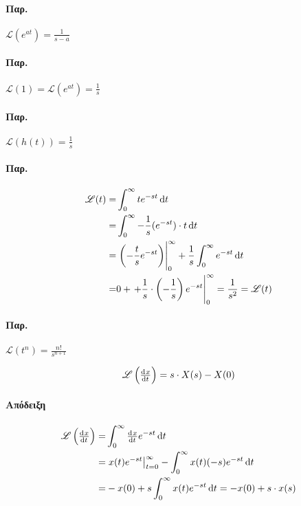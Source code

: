 \documentclass[11pt,a4paper,titlepage,draft]{article}
\begin{document}
\paragraph{Παρ.}
\(
\mathscr{L}(e^{at}) = \frac{1}{s-a}
\)

\paragraph{Παρ.}
\(
\mathscr{L}(1) = \mathscr{L}(e^{at})=\frac{1}{s}
\)

\paragraph{Παρ.}
\(
\mathscr{L}\left(h(t)\right) = \frac{1}{s}
\)

\paragraph{Παρ.}
\begin{align*}
\mathscr{L}(t)=&\int_0^\infty te^{-st}\dif t
\\=&
\int_0^\infty -\frac{1}{s} (e^{-st})\cdot t \dif t
\\=&
\left.\left( -\frac{t}{s}e^{-st}\right)\right|_0^\infty + \frac{1}{s}\int_0^\infty e^{-st}\dif t
\\=&
0+\left. + \frac{1}{s}\cdot\left(-\frac{1}{s}\right) e^{-st}\right|_0^\infty = \frac{1}{s^2}=\mathscr{L}(t)
\end{align*}

\paragraph{Παρ.}
\(
\mathscr{L}(t^n) = \frac{n!}{s^{n+1}}
\)

\begin{theorem*}{}
\[
\mathscr{L}\left(
\od{x}{t}
\right)
= s\cdot X(s)-X(0)
\]
\end{theorem*}
\paragraph{Απόδειξη}
\begin{align*}
\mathscr{L}\left(
\od{x}{t}
\right) =& \int_0^\infty\od{x}{t} e^{-st}\dif t
\\ =&
\left.x(t)e^{-st}\right|_{t=0}^\infty - \int_0^\infty x(t)(-s)e^{-st} \dif t
\\=&
-x(0)+s\int_0^\infty x(t)e^{-st}\dif t = -x(0)+s\cdot x(s)
\end{align*}
\end{document}
